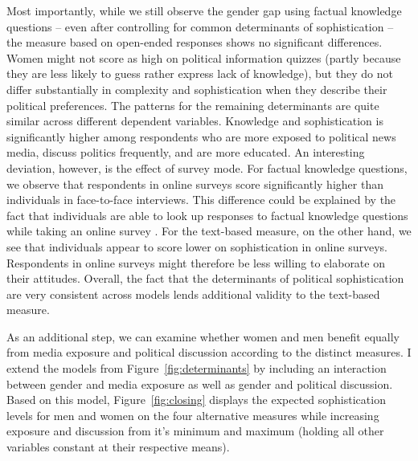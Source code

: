 \documentclass[12pt]{article}
\begin{document}
Most importantly, while we still observe the gender gap using factual knowledge questions -- even after controlling for common determinants of sophistication -- the measure based on open-ended responses shows no significant differences. Women might not score as high on political information quizzes (partly because they are less likely to guess rather express lack of knowledge), but they do not differ substantially in complexity and sophistication when they describe their political preferences. The patterns for the remaining determinants are quite similar across different dependent variables. Knowledge and sophistication is significantly higher among respondents who are more exposed to political news media, discuss politics frequently, and are more educated. An interesting deviation, however, is the effect of survey mode. For factual knowledge questions, we observe that respondents in online surveys score significantly higher than individuals in face-to-face interviews. This difference could be explained by the fact that individuals are able to look up responses to factual knowledge questions while taking an online survey \citep[see also][]{clifford2016cheating}. For the text-based measure, on the other hand, we see that individuals appear to score lower on sophistication in online surveys. Respondents in online surveys might therefore be less willing to elaborate on their attitudes. Overall, the fact that the determinants of political sophistication are very consistent across models lends additional validity to the text-based measure.

As an additional step, we can examine whether women and men benefit equally from media exposure and political discussion according to the distinct measures. I extend the models from Figure~\ref{fig:determinants} by including an interaction between gender and media exposure as well as gender and political discussion. Based on this model, Figure~\ref{fig:closing} displays the expected sophistication levels for men and women on the four alternative measures while increasing exposure and discussion from it's minimum and maximum (holding all other variables constant at their respective means).
\end{document}
